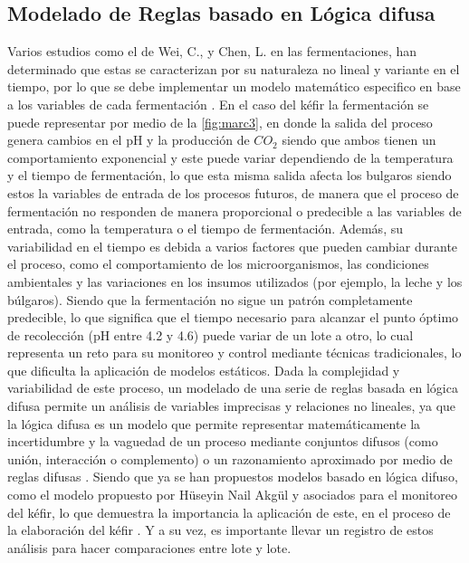 \subsection{Modelado de Reglas basado en Lógica difusa}
Varios estudios como el de Wei, C., y Chen, L. en las fermentaciones, han
determinado que estas se caracterizan por su naturaleza no lineal y variante en el
tiempo, por lo que se debe implementar un modelo matemático especifico en base
a los variables de cada fermentación \cite{MunozNungo2022}. En el caso del kéfir la 
fermentación se puede representar por medio de la \cref{fig:marc3},
en donde la salida del proceso genera cambios en el pH y la producción de $CO_{2}$ siendo 
que ambos tienen un comportamiento exponencial y este puede variar dependiendo de 
la temperatura y el tiempo de fermentación, lo que esta misma salida
afecta los bulgaros siendo estos la variables de entrada de los procesos futuros, de manera
que el proceso de fermentación no responden de manera proporcional o predecible a las
variables de entrada, como la temperatura o el tiempo de fermentación. Además, su
variabilidad en el tiempo es debida a varios factores que pueden cambiar durante el
proceso, como el comportamiento de los microorganismos, las condiciones
ambientales y las variaciones en los insumos utilizados (por ejemplo, la leche y los
búlgaros). Siendo que la fermentación no sigue un patrón completamente
predecible, lo que significa que el tiempo necesario para alcanzar el punto óptimo
de recolección (pH entre 4.2 y 4.6) puede variar de un lote a otro, 
lo cual representa un reto para su monitoreo y control mediante técnicas tradicionales, lo que dificulta
la aplicación de modelos estáticos.\newline
Dada la complejidad y variabilidad de este proceso, un modelado de una serie de
reglas basada en lógica difusa permite un análisis de variables imprecisas y
relaciones no lineales, ya que la lógica difusa es un modelo que permite representar
matemáticamente la incertidumbre y la vaguedad de un proceso mediante conjuntos
difusos (como unión, interacción o complemento) o un razonamiento aproximado
por medio de reglas difusas \cite{Morcillo}. Siendo que ya se han propuestos modelos basado
en lógica difuso, como el modelo propuesto por Hüseyin Nail Akgül y asociados para
el monitoreo del kéfir, lo que demuestra la importancia la aplicación de este, en el
proceso de la elaboración del kéfir \cite{Akgul2014}. Y a su vez, es importante llevar un registro
de estos análisis para hacer comparaciones entre lote y lote.

